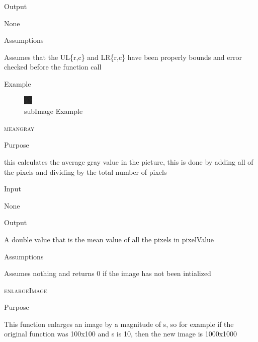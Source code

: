 \documentclass[pdftex, 11pt]{article}
\begin{document}
\begin{description}
\begin{description}
\begin{itemize}
				\end{itemize}


			\item{Output}

				None


			\item{Assumptions}

				Assumes that the UL\{r,c\} and LR\{r,c\} have been
				properly bounds and error checked before the function
				call

			\item{Example}

				\begin{figure}[h]
					\centering
					\caption{subImage Example}
					\includegraphics{images/outsubimg.png}
				\end{figure}

		\end{description}


	\item{\textsc{meangray}}
		\begin{description}
			\item{Purpose}

				
				this calculates the average gray value in the
				picture, this is done by adding
				all of the pixels and dividing by the total
				number of pixels

			\item{Input}

				None

			\item{Output}

				A double value that is the mean value of all
				the pixels in pixelValue


			\item{Assumptions}

				Assumes nothing and returns 0 if the image 
				has not been intialized

		\end{description}


	\item{\textsc{enlargeImage}}
		\begin{description}
			\item{Purpose}
				
				This function enlarges an image by a 
				magnitude of s, so for example if the
				original function was 100x100 and s is 
				10, then the new image is 1000x1000


\end{description}
\end{description}
\end{document}
